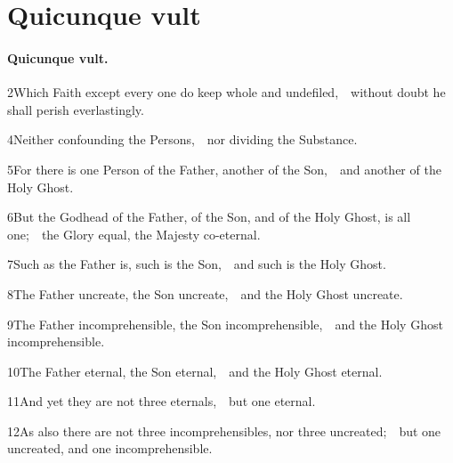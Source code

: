 \chapter{Quicunque vult} %

\subsubsection{Quicunque vult.}

2\enspace Which Faith except every one do keep whole and undefiled,\ \star\ without doubt he shall perish everlastingly.


4\enspace Neither confounding the Persons,\ \star\ nor dividing the Substance.

5\enspace For there is one Person of the Father, another of the Son,\ \star\ and another of the Holy Ghost.

6\enspace But the Godhead of the Father, of the Son, and of the Holy Ghost, is all one;\ \star\ the Glory equal, the Majesty co-eternal.

7\enspace Such as the Father is, such is the Son,\ \star\ and such is the Holy Ghost.

8\enspace The Father uncreate, the Son uncreate,\ \star\ and the Holy Ghost uncreate.

9\enspace The Father incomprehensible, the Son incomprehensible,\ \star\ and the Holy Ghost incomprehensible.

10\enspace The Father eternal, the Son eternal,\ \star\ and the Holy Ghost eternal.

11\enspace And yet they are not three eternals,\ \star\ but one eternal.

12\enspace As also there are not three incomprehensibles, nor three uncreated;\ \star\ but one uncreated, and one incomprehensible.

